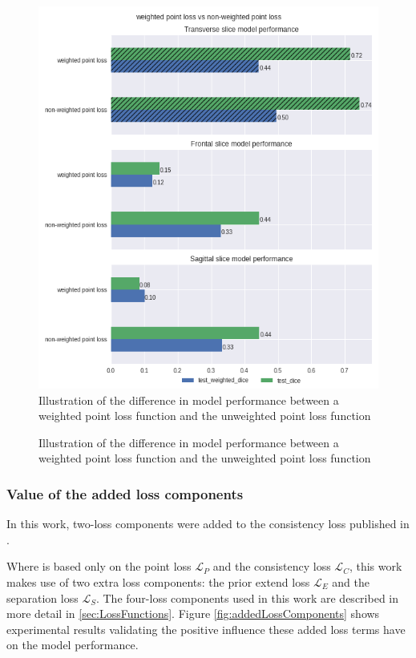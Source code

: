 \begin{figure}
    \centering
    \includegraphics[width=.95\textwidth]{images/weightedvsnonweighted.png}
    \caption{Illustration of the difference in model performance between a weighted point loss function and the unweighted point loss function\label{fig:weighted_vs_unweighted}}
\end{figure}

\begin{figure}
    \centering
    
    \caption{Illustration of the difference in model performance between a weighted point loss function and the unweighted point loss function}
\end{figure}

\subsubsection{Value of the added loss components}
\par{
    In this work, two-loss components were added to the consistency loss published in \cite{Laradji}.
    
    Where \cite{Laradji} is based only on the point loss $\mathcal{L}_P$ and the consistency loss $\mathcal{L}_C$, this work makes use of two extra loss components:
    the prior extend loss $\mathcal{L}_E$ and the separation loss $\mathcal{L}_S$. The four-loss components used in this work are described in more detail in \ref{sec:LossFunctions}.
    Figure \ref{fig:addedLossComponents} shows experimental results validating the positive influence these added loss terms have on the model performance.
}



